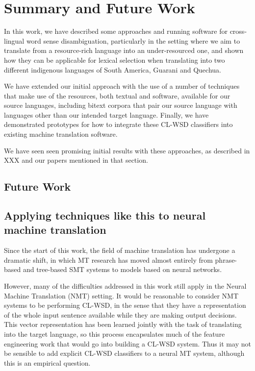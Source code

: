 \chapter{Summary and Future Work}
\label{chap:conclusions}

In this work, we have described some approaches and running software for
cross-lingual word sense disambiguation, particularly in the setting where we
aim to translate from a resource-rich language into an under-resourced one, and
shown how they can be applicable for lexical selection when translating into
two different indigenous languages of South America, Guarani and Quechua.

We have extended our initial approach with the use of a number of techniques
that make use of the resources, both textual and software, available for our
source languages, including bitext corpora that pair our source language with
languages other than our intended target language. Finally, we have
demonstrated prototypes for how to integrate these CL-WSD classifiers into
existing machine translation software.

We have seen seen promising initial results with these approaches, as described
in XXX and our papers mentioned in that section.


\section{Future Work}

\section{Applying techniques like this to neural machine translation}
Since the start of this work, the field of machine translation has undergone a
dramatic shift, in which MT research has moved almost entirely from
phrase-based and tree-based SMT systems to models based on neural networks.

However, many of the difficulties addressed in this work still apply in the
Neural Machine Translation (NMT) setting. It would be reasonable to consider
NMT systems to be performing CL-WSD, in the sense that they have a
representation of the whole input sentence available while they are making
output decisions. This vector representation has been learned jointly with the
task of translating into the target language, so this process encapsulates much
of the feature engineering work that would go into building a CL-WSD system.
Thus it may not be sensible to add explicit CL-WSD classifiers to a neural MT
system, although this is an empirical question.

